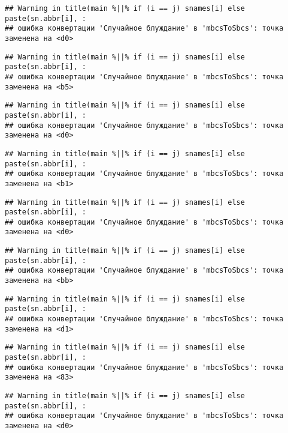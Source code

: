 \documentclass[
]{article}
\begin{document}
\begin{verbatim}
## Warning in title(main %||% if (i == j) snames[i] else paste(sn.abbr[i], :
## ошибка конвертации 'Случайное блуждание' в 'mbcsToSbcs': точка заменена на <d0>
\end{verbatim}

\begin{verbatim}
## Warning in title(main %||% if (i == j) snames[i] else paste(sn.abbr[i], :
## ошибка конвертации 'Случайное блуждание' в 'mbcsToSbcs': точка заменена на <b5>
\end{verbatim}

\begin{verbatim}
## Warning in title(main %||% if (i == j) snames[i] else paste(sn.abbr[i], :
## ошибка конвертации 'Случайное блуждание' в 'mbcsToSbcs': точка заменена на <d0>
\end{verbatim}

\begin{verbatim}
## Warning in title(main %||% if (i == j) snames[i] else paste(sn.abbr[i], :
## ошибка конвертации 'Случайное блуждание' в 'mbcsToSbcs': точка заменена на <b1>
\end{verbatim}

\begin{verbatim}
## Warning in title(main %||% if (i == j) snames[i] else paste(sn.abbr[i], :
## ошибка конвертации 'Случайное блуждание' в 'mbcsToSbcs': точка заменена на <d0>
\end{verbatim}

\begin{verbatim}
## Warning in title(main %||% if (i == j) snames[i] else paste(sn.abbr[i], :
## ошибка конвертации 'Случайное блуждание' в 'mbcsToSbcs': точка заменена на <bb>
\end{verbatim}

\begin{verbatim}
## Warning in title(main %||% if (i == j) snames[i] else paste(sn.abbr[i], :
## ошибка конвертации 'Случайное блуждание' в 'mbcsToSbcs': точка заменена на <d1>
\end{verbatim}

\begin{verbatim}
## Warning in title(main %||% if (i == j) snames[i] else paste(sn.abbr[i], :
## ошибка конвертации 'Случайное блуждание' в 'mbcsToSbcs': точка заменена на <83>
\end{verbatim}

\begin{verbatim}
## Warning in title(main %||% if (i == j) snames[i] else paste(sn.abbr[i], :
## ошибка конвертации 'Случайное блуждание' в 'mbcsToSbcs': точка заменена на <d0>
\end{verbatim}
\end{document}
